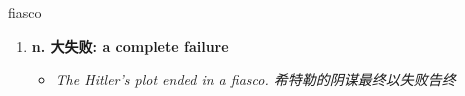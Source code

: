 
\begin{frame}
{\huge fiasco}
\begin{center}
\begin{enumerate}\Large
  \item \textbf{n. 大失败: a complete failure}
  \begin{itemize}
    \item \em{\Large{The Hitler's plot ended in a fiasco. 希特勒的阴谋最终以失败告终}}
  \end{itemize}
\end{enumerate}
\end{center}
\end{frame}
